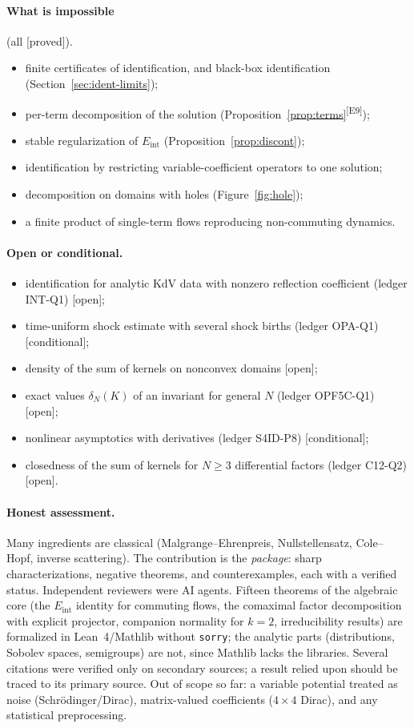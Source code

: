 \documentclass[11pt,a4paper]{article}
\theoremstyle{definition}
\newcommand{\badge}[2]{\textcolor{#1}{\textsf{\footnotesize[#2]}}}
\newcommand{\proved}[1][]{\badge{cC}{proved#1}}
\newcommand{\condl}{\badge{cD}{conditional}}
\newcommand{\openq}{\badge{cB}{open}}
\newcommand{\led}[1]{\textcolor{cG}{\textsf{\footnotesize(ledger #1)}}}
\newcommand{\edmark}[1]{\textsuperscript{\textcolor{cB}{\textsf{[#1]}}}}
\newcommand{\Eint}{E_{\mathrm{int}}}
\begin{document}
\paragraph{What is impossible} (all \proved).
\begin{itemize}[nosep]
\item finite certificates of identification, and black-box identification (Section~\ref{sec:ident-limits});
\item per-term decomposition of the solution (Proposition~\ref{prop:terms}\edmark{E9});
\item stable regularization of $\Eint$ (Proposition~\ref{prop:discont});
\item identification by restricting variable-coefficient operators to one solution;
\item decomposition on domains with holes (Figure~\ref{fig:hole});
\item a finite product of single-term flows reproducing non-commuting dynamics.
\end{itemize}

\paragraph{Open or conditional.}
\begin{itemize}[nosep]
\item identification for analytic KdV data with nonzero reflection coefficient \led{INT-Q1} \openq;
\item time-uniform shock estimate with several shock births \led{OPA-Q1} \condl;
\item density of the sum of kernels on nonconvex domains \openq;
\item exact values $\delta_N(K)$ of an invariant for general $N$ \led{OPF5C-Q1} \openq;
\item nonlinear asymptotics with derivatives \led{S4ID-P8} \condl;
\item closedness of the sum of kernels for $N\ge3$ differential factors \led{C12-Q2} \openq.
\end{itemize}

\paragraph{Honest assessment.} Many ingredients are classical (Malgrange--Ehrenpreis, Nullstellensatz, Cole--Hopf, inverse scattering). The contribution is the \emph{package}: sharp characterizations, negative theorems, and counterexamples, each with a verified status. Independent reviewers were AI agents. Fifteen theorems of the algebraic core (the $\Eint$ identity for commuting flows, the comaximal factor decomposition with explicit projector, companion normality for $k=2$, irreducibility results) are formalized in Lean~4/Mathlib without \texttt{sorry}; the analytic parts (distributions, Sobolev spaces, semigroups) are not, since Mathlib lacks the libraries. Several citations were verified only on secondary sources; a result relied upon should be traced to its primary source. Out of scope so far: a variable potential treated as noise (Schr\"odinger/Dirac), matrix-valued coefficients ($4\times4$ Dirac), and any statistical preprocessing.
\end{document}
